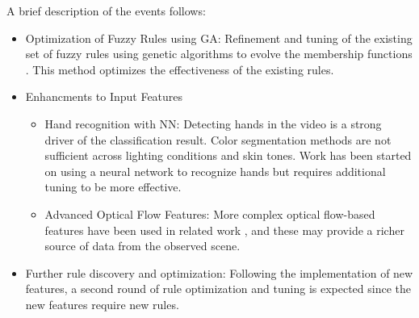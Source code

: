 \documentclass[12pt]{report}
\begin{document}
A brief description of the events follows:
\begin{itemize}
    \item Optimization of Fuzzy Rules using GA: Refinement and tuning of the existing set of fuzzy rules using genetic algorithms to evolve the membership functions \cite{Tan1999OptimizationRating}. This method optimizes the effectiveness of the existing rules.
    \item Enhancments to Input Features
    \begin{itemize}
        \item Hand recognition with NN: Detecting hands in the video is a strong driver of the classification result. Color segmentation methods are not sufficient across lighting conditions and skin tones. Work has been started on using a neural network to recognize hands but requires additional tuning to be more effective.
        \item Advanced Optical Flow Features: More complex optical flow-based features have been used in related work \cite{Ryoo2015, Abebe2016}, and these may provide a richer source of data from the observed scene.
    \end{itemize}
    \item Further rule discovery and optimization: Following the implementation of new features, a second round of rule optimization and tuning is expected since the new features require new rules.
\end{itemize}

\end{document}
